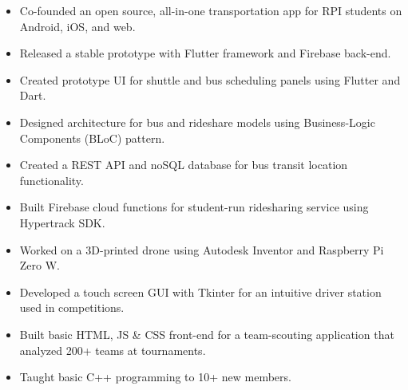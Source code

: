 \documentclass[10pt,a4paper,ragged2e]{altacv}
\begin{document}
\begin{itemize}
\item Co-founded an open source, all-in-one transportation app for RPI students on Android, iOS, and web.
\item Released a stable prototype with Flutter framework and Firebase back-end.
\item Created prototype UI for shuttle and bus scheduling panels using Flutter and Dart.
\item Designed architecture for bus and rideshare models using Business-Logic Components (BLoC) pattern.
\item Created a REST API and noSQL database for bus transit location functionality.
\item Built Firebase cloud functions for student-run ridesharing service using Hypertrack SDK.
\end{itemize}

\divider



\begin{itemize}
\item Worked on a 3D-printed drone using Autodesk Inventor and Raspberry Pi Zero W.
\item Developed a touch screen GUI with Tkinter for an intuitive driver station used in competitions.
\item Built basic HTML, JS \& CSS front-end for a team-scouting application that analyzed 200+ teams at tournaments.
\item Taught basic C++ programming to 10+ new members.
\end{itemize}


\clearpage


\nocite{*}


\end{document}
